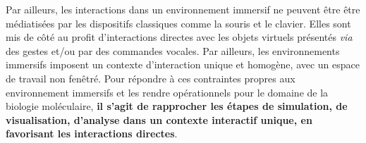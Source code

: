 Par ailleurs, les interactions dans un environnement immersif ne peuvent être être médiatisées par les dispositifs classiques comme la souris et le clavier. Elles sont mis de côté au profit d'interactions directes avec les objets virtuels présentés \textit{via} des gestes et/ou par des commandes vocales. Par ailleurs, les environnements immersifs imposent un contexte d'interaction unique et homogène, avec un espace de travail non fenêtré. Pour répondre à ces contraintes propres aux environnement immersifs et les rendre opérationnels pour le domaine de la biologie moléculaire, \textbf{il s'agit de rapprocher les étapes de simulation, de visualisation, d'analyse dans un contexte interactif unique, en favorisant les interactions directes}.






